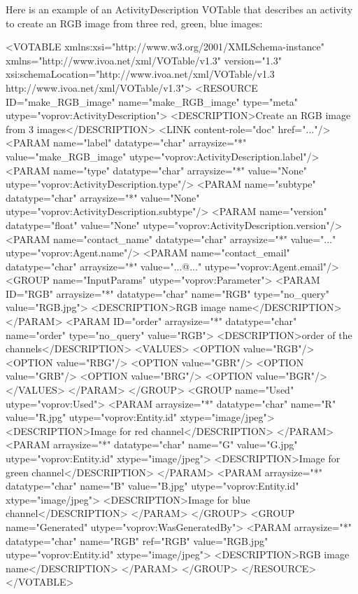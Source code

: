 Here is an example of an ActivityDescription VOTable that describes an activity to create an RGB image from three red, green, blue images:


\begin{verbnobox}[\scriptsize]

<VOTABLE xmlns:xsi="http://www.w3.org/2001/XMLSchema-instance" 
    xmlns="http://www.ivoa.net/xml/VOTable/v1.3" version="1.3" 
    xsi:schemaLocation="http://www.ivoa.net/xml/VOTable/v1.3 
    http://www.ivoa.net/xml/VOTable/v1.3">
  <RESOURCE ID="make_RGB_image" name="make_RGB_image" 
      type="meta" utype="voprov:ActivityDescription">
    <DESCRIPTION>Create an RGB image from 3 images</DESCRIPTION>
    <LINK content-role="doc" href="..."/>
    <PARAM name="label" datatype="char" arraysize="*" 
        value="make_RGB_image" utype="voprov:ActivityDescription.label"/>
    <PARAM name="type" datatype="char" arraysize="*" 
        value="None" utype="voprov:ActivityDescription.type"/>
    <PARAM name="subtype" datatype="char" arraysize="*" 
        value="None" utype="voprov:ActivityDescription.subtype"/>
    <PARAM name="version" datatype="float" 
        value="None" utype="voprov:ActivityDescription.version"/>
    <PARAM name="contact_name" datatype="char" arraysize="*" 
        value="..." utype="voprov:Agent.name"/>
    <PARAM name="contact_email" datatype="char" arraysize="*" 
        value="...@..." utype="voprov:Agent.email"/>
    <GROUP name="InputParams" utype="voprov:Parameter">
      <PARAM ID="RGB" arraysize="*" datatype="char" name="RGB" 
          type="no_query" value="RGB.jpg">
        <DESCRIPTION>RGB image name</DESCRIPTION>
      </PARAM>
      <PARAM ID="order" arraysize="*" datatype="char" name="order" 
          type="no_query" value="RGB">
        <DESCRIPTION>order of the channels</DESCRIPTION>
        <VALUES>
          <OPTION value="RGB"/>
          <OPTION value="RBG"/>
          <OPTION value="GBR"/>
          <OPTION value="GRB"/>
          <OPTION value="BRG"/>
          <OPTION value="BGR"/>
        </VALUES>
      </PARAM>
    </GROUP>
    <GROUP name="Used" utype="voprov:Used">
      <PARAM arraysize="*" datatype="char" name="R" 
          value="R.jpg" utype="voprov:Entity.id" xtype="image/jpeg">
        <DESCRIPTION>Image for red channel</DESCRIPTION>
      </PARAM>
      <PARAM arraysize="*" datatype="char" name="G" 
          value="G.jpg" utype="voprov:Entity.id" xtype="image/jpeg">
        <DESCRIPTION>Image for green channel</DESCRIPTION>
      </PARAM>
      <PARAM arraysize="*" datatype="char" name="B"
          value="B.jpg" utype="voprov:Entity.id" xtype="image/jpeg">
        <DESCRIPTION>Image for blue channel</DESCRIPTION>
      </PARAM>
    </GROUP>
    <GROUP name="Generated" utype="voprov:WasGeneratedBy">
      <PARAM arraysize="*" datatype="char" name="RGB" ref="RGB"
          value="RGB.jpg" utype="voprov:Entity.id"  xtype="image/jpeg">
        <DESCRIPTION>RGB image name</DESCRIPTION>
      </PARAM>
    </GROUP>
  </RESOURCE>
</VOTABLE>

\end{verbnobox}

